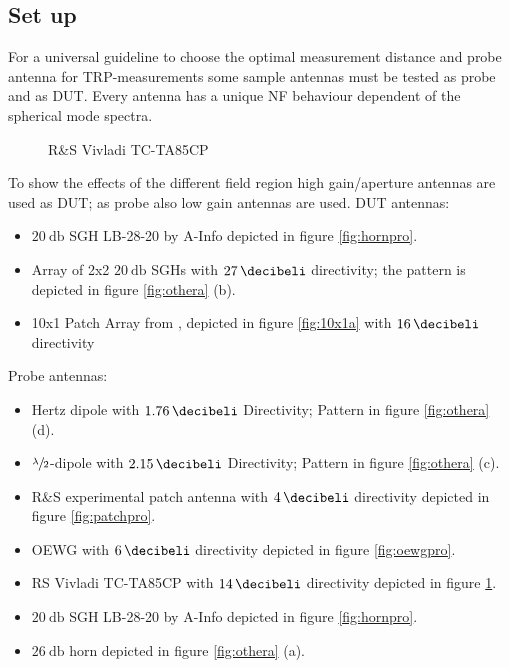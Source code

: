 \subsection{Set up}

For a universal guideline to choose the optimal measurement distance and probe antenna for \ac{TRP}-measurements some sample antennas must be tested as probe and as \ac{DUT}. Every antenna has a unique \ac{NF} behaviour dependent of the spherical mode spectra.

\begin{figure}
  \centering
  \centering
\caption{R\&{}S Vivladi TC-TA85CP}
\label{fig:vivpro}
\end{figure}

To show the effects of the different field region high gain/aperture antennas are used as \ac{DUT}; as probe also low gain antennas are used. \ac{DUT} antennas:

\begin{itemize}
\item $\SI{20}{\decibel}$ \ac{SGH} LB-28-20 by A-Info depicted in figure \ref{fig:hornpro}.
\item Array of 2x2 $\SI{20}{\decibel}$ \acp{SGH} with $\SI{27}{\decibeli}$ directivity; the pattern is depicted in figure \ref{fig:othera} (b).
\item 10x1 Patch Array from \cite{7481205}, depicted in figure \ref{fig:10x1a} with $\SI{16}{\decibeli}$ directivity
\end{itemize}

Probe antennas:

\begin{itemize}
\item Hertz dipole with $\SI{1.76}{\decibeli}$ Directivity; Pattern in figure \ref{fig:othera} (d).
\item $\sfrac{\lambda}{2}$-dipole with $\SI{2.15}{\decibeli}$ Directivity; Pattern in figure \ref{fig:othera} (c).
\item R\&{}S experimental patch antenna with $\SI{4}{\decibeli}$ directivity depicted in figure \ref{fig:patchpro}.
\item \ac{OEWG} with $\SI{6}{\decibeli}$ directivity depicted in figure \ref{fig:oewgpro}.
\item \ac{RS} Vivladi TC-TA85CP with $\SI{14}{\decibeli}$ directivity depicted in figure \ref{fig:vivpro}.
\item $\SI{20}{\decibel}$ \ac{SGH} LB-28-20 by A-Info depicted in figure \ref{fig:hornpro}.
\item $\SI{26}{\decibel}$ horn depicted in figure \ref{fig:othera} (a).
\end{itemize}

